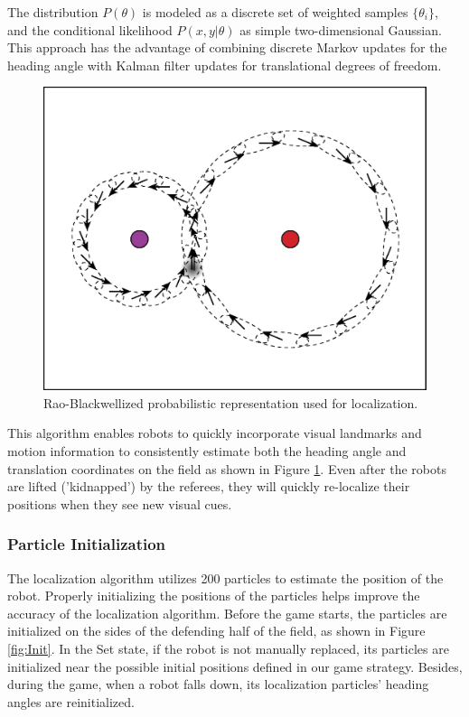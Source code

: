 \documentclass{article}
\begin{document}
 	The distribution $P(\theta)$ is modeled as a discrete set of weighted samples $\{\theta_{i}\}$, and the conditional likelihood $P(x,y|\theta)$ as simple two-dimensional Gaussian. This approach has the advantage of combining discrete Markov updates for the heading angle with Kalman filter updates for translational degrees of freedom.

	\begin{figure}[H]
		\centering
		\includegraphics[width=.6\textwidth]{figures/RaoBlackwell.eps}
		\caption{Rao-Blackwellized probabilistic representation used for localization.}
		\label{fig:raoblack}
	\end{figure}
 
	This algorithm enables robots to quickly incorporate visual landmarks and motion information to consistently estimate both the heading angle and translation coordinates on the field as shown in Figure \ref{fig:raoblack}. Even after the robots are lifted ('kidnapped') by the referees, they will quickly re-localize their positions when they see new visual cues.	

\subsubsection{Particle Initialization}
	The localization algorithm utilizes 200 particles to estimate the position of the robot. Properly initializing the positions of the particles helps improve the accuracy of the localization algorithm. Before the game starts, the particles are initialized on the sides of the defending half of the field, as shown in Figure \ref{fig:Init}. In the Set state, if the robot is not manually replaced, its particles are initialized near the possible initial positions defined in our game strategy. Besides, during the game, when a robot falls down, its localization particles' heading angles are reinitialized.
    
\end{document}
